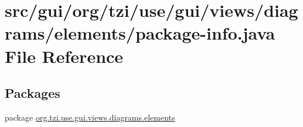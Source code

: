 \hypertarget{package-info_8java}{\section{src/gui/org/tzi/use/gui/views/diagrams/elements/package-\/info.java File Reference}
\label{package-info_8java}
}
\subsection*{Packages}
\begin{DoxyCompactItemize}
\item 
package \hyperlink{namespaceorg_1_1tzi_1_1use_1_1gui_1_1views_1_1diagrams_1_1elements}{org.\-tzi.\-use.\-gui.\-views.\-diagrams.\-elements}
\end{DoxyCompactItemize}
